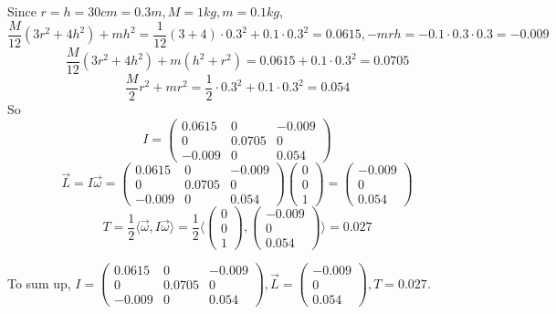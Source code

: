 \documentclass[a4paper,12pt,titlepage]{article}
\begin{document}
\section{}
\subsection{}
Since $r=h=30cm=0.3m, M=1kg,m=0.1kg$,
$$\dfrac{M}{12}(3r^2+4h^2)+mh^2=\dfrac{1}{12}(3+4)\cdot 0.3^2+0.1\cdot 0.3^2=0.0615,-mrh=-0.1\cdot0.3\cdot0.3=-0.009 $$
$$\dfrac{M}{12}(3r^2+4h^2)+m(h^2+r^2)=0.0615+0.1\cdot 0.3^2=0.0705$$
$$\dfrac{M}{2}r^2+mr^2=\dfrac{1}{2}\cdot0.3^2+0.1\cdot0.3^2=0.054$$
So 
$$I=\left(\begin{array}{ccc}
0.0615&0&-0.009\\
0&0.0705&0\\
-0.009&0&0.054
\end{array}\right)$$
$$\overrightarrow{L}=I\overrightarrow{\omega}=\left(\begin{array}{ccc}
0.0615&0&-0.009\\
0&0.0705&0\\
-0.009&0&0.054
\end{array}\right)\left(\begin{array}{c}
0\\
0\\
1
\end{array}\right)=\left(\begin{array}{c}
-0.009\\
0\\
0.054
\end{array}\right)$$
$$T=\dfrac{1}{2}\langle \overrightarrow{\omega},I\overrightarrow{\omega}\rangle=\dfrac{1}{2}\langle \left(\begin{array}{c}
0\\
0\\
1
\end{array}\right),\left(\begin{array}{c}
-0.009\\
0\\
0.054
\end{array}\right)\rangle=0.027$$

To sum up, $I=\left(\begin{array}{ccc}
0.0615&0&-0.009\\
0&0.0705&0\\
-0.009&0&0.054
\end{array}\right),\overrightarrow{L}=\left(\begin{array}{c}
-0.009\\
0\\
0.054
\end{array}\right),T=0.027$.
\end{document}
